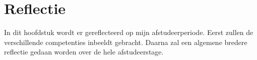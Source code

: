 \chapter{Reflectie}
In dit hoofdstuk wordt er gereflecteerd op mijn afstudeerperiode.
Eerst zullen de verschillende competenties inbeeldt gebracht.
Daarna zal een algemene bredere reflectie gedaan worden over de hele afstudeerstage.




